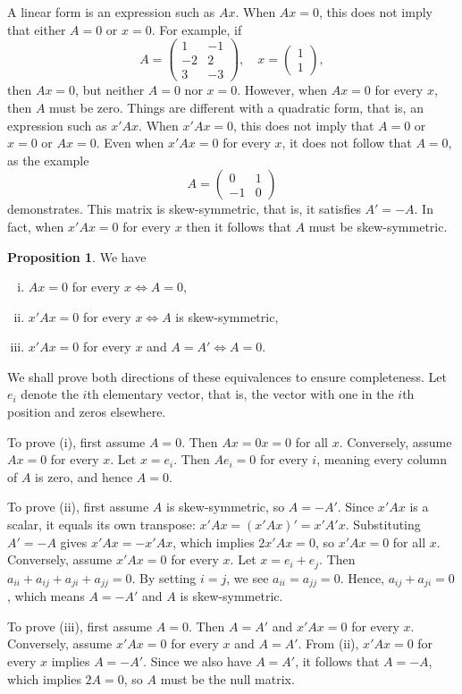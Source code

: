 \documentclass[12pt,a4paper]{article}
\makeatletter
\theoremstyle{definition}
\newtheorem{proposition}{Proposition}
\renewenvironment{proof}[1][\proofname]{\par
  \pushQED{\qed}%
  \normalfont \topsep6\p@\@plus6\p@\relax
  \trivlist
  \item[\hskip\labelsep\bfseries #1\@addpunct{.}]\ignorespaces
}{%
  \popQED\endtrivlist\@endpefalse
}
\makeatother
\begin{document}
A linear form is an expression such as $Ax$. When $Ax = 0$, this does not imply that either $A = 0$ or $x = 0$. %
For example, if
\[
A = \begin{pmatrix} 1 & -1 \\ -2 & 2 \\ 3 & -3 \end{pmatrix}, \quad
x = \begin{pmatrix} 1 \\ 1 \end{pmatrix},
\]
then $Ax = 0$, but neither $A = 0$ nor $x = 0$. However, when $Ax = 0$ for every $x$, then $A$ must be zero. %
Things are different with a quadratic form, that is, an expression such as $x'Ax$. When $x'Ax = 0$, this does not imply that $A = 0$ or $x = 0$ or $Ax = 0$. %
Even when $x'Ax = 0$ for every $x$, it does not follow that $A = 0$, as the example
\[
A = \begin{pmatrix} 0 & 1 \\ -1 & 0 \end{pmatrix}
\]
demonstrates. This matrix is skew-symmetric, that is, it satisfies $A' = -A$. %
In fact, when $x'Ax = 0$ for every $x$ then it follows that $A$ must be skew-symmetric. %

\begin{proposition}\label{prp:2}
We have
\begin{enumerate}[(i)]
\item $Ax = 0$ for every $x \iff A = 0$,
\item $x'Ax = 0$ for every $x \iff A$ is skew-symmetric,
\item $x'Ax = 0$ for every $x$ and $A = A' \iff A = 0$.
\end{enumerate}
\end{proposition}

\begin{proof}
We shall prove both directions of these equivalences to ensure completeness. Let $e_i$ denote the $i$th elementary vector, that is, the vector with one in the $i$th position and zeros elsewhere.

To prove (i), first assume $A = 0$. Then $Ax = 0x = 0$ for all $x$. Conversely, assume $Ax = 0$ for every $x$. Let $x = e_i$. Then $Ae_i = 0$ for every $i$, meaning every column of $A$ is zero, and hence $A = 0$.

To prove (ii), first assume $A$ is skew-symmetric, so $A = -A'$. Since $x'Ax$ is a scalar, it equals its own transpose: $x'Ax = (x'Ax)' = x'A'x$. Substituting $A' = -A$ gives $x'Ax = -x'Ax$, which implies $2x'Ax = 0$, so $x'Ax = 0$ for all $x$. Conversely, assume $x'Ax = 0$ for every $x$. Let $x = e_i + e_j$. Then $a_{ii} + a_{ij} + a_{ji} + a_{jj} = 0$. By setting $i = j$, we see $a_{ii} = a_{jj} = 0$. Hence, $a_{ij} + a_{ji} = 0$, which means $A = -A'$ and $A$ is skew-symmetric.

To prove (iii), first assume $A = 0$. Then $A = A'$ and $x'Ax = 0$ for every $x$. Conversely, assume $x'Ax = 0$ for every $x$ and $A = A'$. From (ii), $x'Ax = 0$ for every $x$ implies $A = -A'$. Since we also have $A = A'$, it follows that $A = -A$, which implies $2A = 0$, so $A$ must be the null matrix.
\end{proof}
\end{document}
